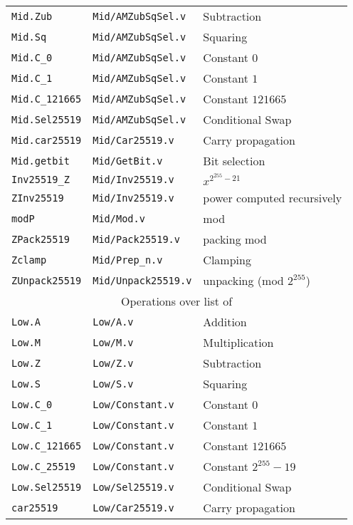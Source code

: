 \begin{table}[h]
\begin{tabular}{ l | l | l }
    \texttt{Mid.Zub} & \texttt{Mid/AMZubSqSel.v} & Subtraction \\
    \texttt{Mid.Sq} & \texttt{Mid/AMZubSqSel.v} & Squaring \\
    \texttt{Mid.C\_0} & \texttt{Mid/AMZubSqSel.v} & Constant $0$ \\
    \texttt{Mid.C\_1} & \texttt{Mid/AMZubSqSel.v} & Constant $1$ \\
    \texttt{Mid.C\_121665} & \texttt{Mid/AMZubSqSel.v} & Constant $121665$ \\
    \texttt{Mid.Sel25519} & \texttt{Mid/AMZubSqSel.v} & Conditional Swap \\
    \texttt{Mid.car25519} & \texttt{Mid/Car25519.v} & Carry propagation \\
    \texttt{Mid.getbit} & \texttt{Mid/GetBit.v} & Bit selection \\
    \texttt{Inv25519\_Z} & \texttt{Mid/Inv25519.v} & $x^{2^{255}-21}$ \\
    \texttt{ZInv25519} & \texttt{Mid/Inv25519.v} & power computed recursively \\
    \texttt{modP} & \texttt{Mid/Mod.v} & mod \p\\
    \texttt{ZPack25519} & \texttt{Mid/Pack25519.v} & packing mod \p\\
    \texttt{Zclamp} & \texttt{Mid/Prep\_n.v} & Clamping \\
    \texttt{ZUnpack25519} & \texttt{Mid/Unpack25519.v} & unpacking (mod $2^{255}$)\\
    \hline
    \multicolumn{3}{c}{Operations over list of \Z}\\
    \hline
    \texttt{Low.A} & \texttt{Low/A.v} & Addition \\
    \texttt{Low.M} & \texttt{Low/M.v} & Multiplication \\
    \texttt{Low.Z} & \texttt{Low/Z.v} & Subtraction \\
    \texttt{Low.S} & \texttt{Low/S.v} & Squaring \\
    \texttt{Low.C\_0} & \texttt{Low/Constant.v} & Constant $0$ \\
    \texttt{Low.C\_1} & \texttt{Low/Constant.v} & Constant $1$\\
    \texttt{Low.C\_121665} & \texttt{Low/Constant.v} & Constant $121665$\\
    \texttt{Low.C\_25519} & \texttt{Low/Constant.v} & Constant $2^{255}-19$\\
    \texttt{Low.Sel25519} & \texttt{Low/Sel25519.v} & Conditional Swap \\
    \texttt{car25519} & \texttt{Low/Car25519.v} & Carry propagation \\

\end{tabular}
\end{table}
